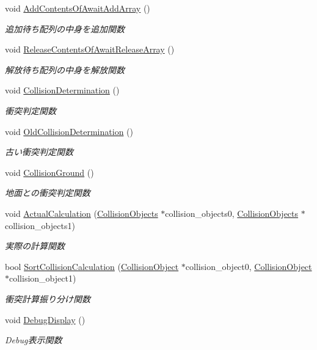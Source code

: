 \begin{DoxyCompactItemize}
\item 
void \mbox{\hyperlink{class_collision_manager_a53e468bb8624f84a5c65c9779781033f}{Add\+Contents\+Of\+Await\+Add\+Array}} ()
\begin{DoxyCompactList}\small\item\em 追加待ち配列の中身を追加関数 \end{DoxyCompactList}\item 
void \mbox{\hyperlink{class_collision_manager_a351353ddde07f2ff4f6642c8e1fc4ede}{Release\+Contents\+Of\+Await\+Release\+Array}} ()
\begin{DoxyCompactList}\small\item\em 解放待ち配列の中身を解放関数 \end{DoxyCompactList}\item 
void \mbox{\hyperlink{class_collision_manager_a67c1ebc4d4a19e06122f11c3eeec89ec}{Collision\+Determination}} ()
\begin{DoxyCompactList}\small\item\em 衝突判定関数 \end{DoxyCompactList}\item 
void \mbox{\hyperlink{class_collision_manager_a25dbc14dbc709a6bc2dc4424e3965dbe}{Old\+Collision\+Determination}} ()
\begin{DoxyCompactList}\small\item\em 古い衝突判定関数 \end{DoxyCompactList}\item 
void \mbox{\hyperlink{class_collision_manager_a1d67f4076eb71e191db5cff4e5abe3b0}{Collision\+Ground}} ()
\begin{DoxyCompactList}\small\item\em 地面との衝突判定関数 \end{DoxyCompactList}\item 
void \mbox{\hyperlink{class_collision_manager_ab7a212529ce17392d2ca120153318090}{Actual\+Calculation}} (\mbox{\hyperlink{class_collision_objects}{Collision\+Objects}} $\ast$collision\+\_\+objects0, \mbox{\hyperlink{class_collision_objects}{Collision\+Objects}} $\ast$collision\+\_\+objects1)
\begin{DoxyCompactList}\small\item\em 実際の計算関数 \end{DoxyCompactList}\item 
bool \mbox{\hyperlink{class_collision_manager_a87f64affda1906cd6eee3d177ca25045}{Sort\+Collision\+Calculation}} (\mbox{\hyperlink{class_collision_object}{Collision\+Object}} $\ast$collision\+\_\+object0, \mbox{\hyperlink{class_collision_object}{Collision\+Object}} $\ast$collision\+\_\+object1)
\begin{DoxyCompactList}\small\item\em 衝突計算振り分け関数 \end{DoxyCompactList}\item 
void \mbox{\hyperlink{class_collision_manager_a4da1241f3905c3855b31d7e20ceed5a1}{Debug\+Display}} ()
\begin{DoxyCompactList}\small\item\em Debug表示関数 \end{DoxyCompactList}\end{DoxyCompactItemize}
